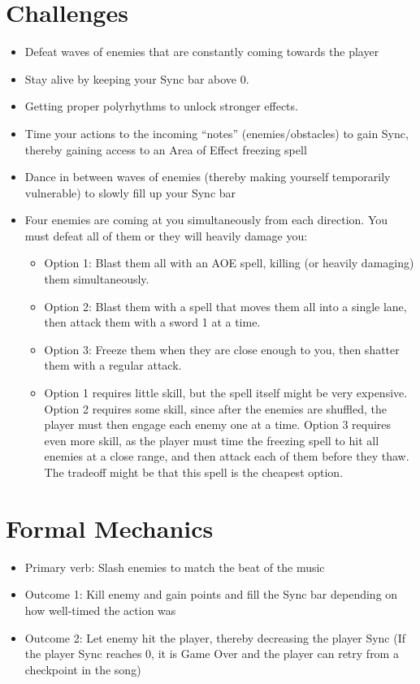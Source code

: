 \documentclass[]{article}
\begin{document}
\section{Challenges}
\begin{itemize}
\item Defeat waves of enemies that are constantly coming towards the player
\item Stay alive by keeping your Sync bar above 0.
\item Getting proper polyrhythms to unlock stronger effects.
\item Time your actions to the incoming “notes” (enemies/obstacles) to gain 
  Sync, thereby gaining access to an Area of Effect freezing spell
\item Dance in between waves of enemies (thereby making yourself temporarily 
  vulnerable) to slowly fill up your Sync bar
\item Four enemies are coming at you simultaneously from each direction. 
  You must defeat all of them or they will heavily damage you:
  \begin{itemize}
  \item Option 1: Blast them all with an AOE spell, killing (or heavily 
    damaging) them simultaneously.
  \item Option 2: Blast them with a spell that moves them all into a single 
    lane, then attack them with a sword 1 at a time.
  \item Option 3: Freeze them when they are close enough to you, then shatter 
    them with a regular attack.
  \item Option 1 requires little skill, but the spell itself might be
    very expensive. Option 2 requires some skill, since after the enemies
    are shuffled, the player must then engage each enemy one at a
    time. Option 3 requires even more skill, as the player must time the
    freezing spell to hit all enemies at a close range, and then attack
    each of them before they thaw. The tradeoff might be that this spell
    is the cheapest option.
  \end{itemize}
\end{itemize}

\section{Formal Mechanics}
\begin{itemize}
\item Primary verb: Slash enemies to match the beat of the music
\item Outcome 1: Kill enemy and gain points and fill the Sync bar 
  depending on how well-timed the action was
\item Outcome 2: Let enemy hit the player, thereby decreasing the player 
  Sync (If the player Sync reaches 0, it is Game Over and the player can 
  retry from a checkpoint in the song)
\end{itemize}
\end{document}
